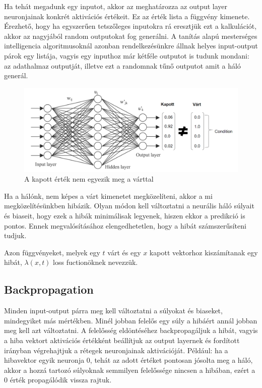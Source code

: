 \documentclass[12pt]{article}
\begin{document}
Ha tehát megadunk egy inputot, akkor az meghatározza az output layer neuronjainak konkrét aktivációs értékeit. Ez az érték lista a függvény kimenete. Érezhető, hogy ha egyszerűen tetszőleges inputokra rá eresztjük ezt a kalkulációt, akkor az nagyjából random outputokat fog generálni. A tanítás alapú mesterséges intelligencia algoritmusoknál azonban rendelkezésünkre állnak helyes input-output párok egy listája, vagyis egy inputhoz már kétféle outputot is tudunk mondani: az adathalmaz outputját, illetve ezt a randomnak tűnő outputot amit a háló generál.

\begin{figure}[h!]
  \includegraphics[width=\linewidth]{kapott_vart.png}
  \caption{A kapott érték nem egyezik meg a várttal}
\end{figure}

Ha a hálónk, nem képes a várt kimenetet megközelíteni, akkor a mi megközelítésünkben hibázik. Olyan módon kell változtatni a neurális háló súlyait és biaseit, hogy ezek a hibák minimálisak legyenek, hiszen ekkor a predikció is pontos. Ennek megvalósításához elengedhetetlen, hogy a hibát számszerűsíteni tudjuk.

Azon függvényeket, melyek egy $t$ várt és egy $x$ kapott vektorhoz kiszámítanak egy hibát, $\lambda(x,t)$ loss fuctionöknek nevezzük.

\subsection{Backpropagation}

Minden input-output párra meg kell változtatni a súlyokat és biaseket, mindegyiket más mértékben. Minél jobban felelős egy súly a hibáért annál jobban meg kell azt változtatni. A felelősség eldöntéséhez backpropagáljuk a hibát, vagyis a hiba vektort aktivációs értékként beállítjuk az output layernek és fordított irányban végrehajtjuk a rétegek neuronjainak aktivációját.
Például: ha a hibavektor egyik neuronja 0, tehát az adott értéket pontosan jósolta meg a háló, akkor a hozzá tartozó súlyoknak semmilyen felelőssége nincsen a hibában, ezért a 0 érték propagálódik vissza rajtuk.
\end{document}
